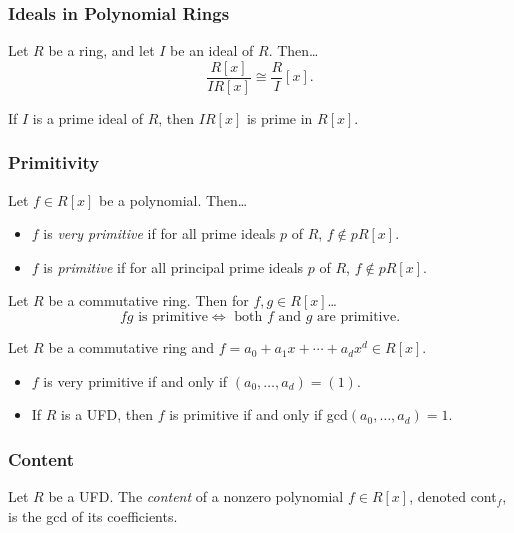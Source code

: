 \subsubsection{Ideals in Polynomial Rings}

\begin{lemma}
Let $R$ be a ring, and let $I$ be an ideal of $R$. Then\dots
$$\frac{R[x]}{IR[x]} \cong \frac{R}{I}[x].$$
\end{lemma}

\begin{corollary}
If $I$ is a prime ideal of $R$, then $IR[x]$ is prime in $R[x]$.
\end{corollary}

\subsubsection{Primitivity}\label{primitivepolynomial}
Let $f \in R[x]$ be a polynomial. Then\dots
\begin{itemize}
  \item $f$ is \emph{very primitive} if for all prime ideals $p$ of $R$, $f \not \in pR[x]$.
  \item $f$ is \emph{primitive} if for all principal prime ideals $p$ of $R$, $f \not \in pR[x]$.
\end{itemize}

\begin{lemma}
Let $R$ be a commutative ring. Then for $f,g \in R[x]$\dots
$$fg \textrm{ is primitive} \Leftrightarrow \textrm{ both } f \textrm{ and } g \textrm{ are primitive}.$$
\end{lemma}

\begin{lemma}
Let $R$ be a commutative ring and $f = a_0 + a_1x + \cdots + a_dx^d \in R[x]$.
\begin{itemize}
  \item $f$ is very primitive if and only if $(a_0,\dots,a_d) = (1)$.
  \item If $R$ is a UFD, then $f$ is primitive if and only if gcd$(a_0,\dots,a_d) = 1$.
\end{itemize}
\end{lemma}

\subsubsection{Content}\label{content}
Let $R$ be a UFD. The \emph{content} of a nonzero polynomial $f \in R[x]$, denoted cont$_f$, is the gcd of its coefficients.


